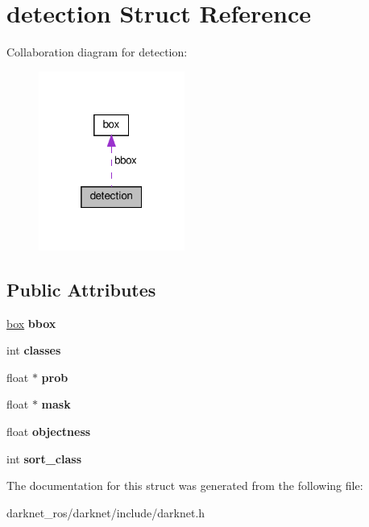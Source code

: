 \hypertarget{structdetection}{}\section{detection Struct Reference}
\label{structdetection}


Collaboration diagram for detection\+:\nopagebreak
\begin{figure}[H]
\begin{center}
\leavevmode
\includegraphics[width=136pt]{structdetection__coll__graph}
\end{center}
\end{figure}
\subsection*{Public Attributes}
\begin{DoxyCompactItemize}
\item 
\mbox{\label{structdetection_a0e96ec314ffa1b5462b81752d1842191}} 
\hyperlink{structbox}{box} {\bfseries bbox}
\item 
\mbox{\label{structdetection_a5501f226bdc7ce3630666a8065fa70b9}} 
int {\bfseries classes}
\item 
\mbox{\label{structdetection_a135fa8f73988691651cb54335e6e20c2}} 
float $\ast$ {\bfseries prob}
\item 
\mbox{\label{structdetection_a52d75f4c96f7ae42075f4792b1852946}} 
float $\ast$ {\bfseries mask}
\item 
\mbox{\label{structdetection_afd81464803f6cca28d0d3171158f0d52}} 
float {\bfseries objectness}
\item 
\mbox{\label{structdetection_a134b1d6d4fa5b3356af1e4af9d53f344}} 
int {\bfseries sort\+\_\+class}
\end{DoxyCompactItemize}


The documentation for this struct was generated from the following file\+:\begin{DoxyCompactItemize}
\item 
darknet\+\_\+ros/darknet/include/darknet.\+h\end{DoxyCompactItemize}
